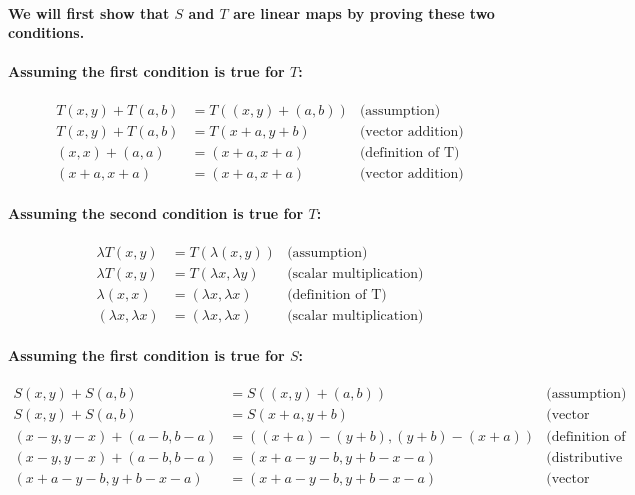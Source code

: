 \documentclass{article}
\begin{document}
\paragraph{\large
We will first show that $S$ and $T$ are linear maps by proving these two conditions.}

\paragraph{\large
Assuming the first condition is true for $T$:}
\begin{align*}
    T(x, y) + T(a, b) &= T((x, y) + (a, b)) & \text{(assumption)} \\
    T(x, y) + T(a, b) &= T(x+a, y+b) & \text{(vector addition)}\\
    (x, x) + (a, a) &= (x+a, x+a) & \text{(definition of T)}\\
    (x+a, x+a) &= (x+a, x+a) & \text{(vector addition)}
\end{align*}

\paragraph{\large
Assuming the second condition is true for $T$:}

\begin{align*}
    \lambda T(x, y) &= T(\lambda (x, y)) & \text{(assumption)}\\
    \lambda T(x, y) &= T(\lambda x, \lambda y) & \text{(scalar multiplication)}\\
    \lambda (x, x) &= (\lambda x, \lambda x) & \text{(definition of T)}\\
    (\lambda x, \lambda x) &= (\lambda x, \lambda x) & \text{(scalar multiplication)}
\end{align*}

\paragraph{\large
Assuming the first condition is true for $S$:}

\begin{align*}
    S(x, y) + S(a, b) &= S((x, y) + (a, b)) & \text{(assumption)}\\
    S(x, y) + S(a, b) &= S(x+a, y+b) & \text{(vector addition)}\\
    (x-y, y-x) + (a-b, b-a) &= ((x+a)-(y+b), (y+b)-(x+a)) & \text{(definition of S)}\\
    (x-y, y-x) + (a-b, b-a) &= (x+a-y-b, y+b-x-a) & \text{(distributive property)}\\
    (x+a-y-b, y+b-x-a) &= (x+a-y-b, y+b-x-a) & \text{(vector addition)}\\
\end{align*}
\end{document}
